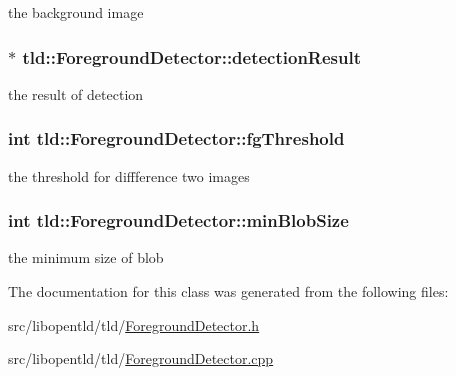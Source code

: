 the background image 

\hypertarget{classtld_1_1ForegroundDetector_a01d0c37f4019847febbea0f9a121b49b}{
\subsubsection[{detection\-Result}]{$\ast$ tld\-::\-Foreground\-Detector\-::detection\-Result}}\label{classtld_1_1ForegroundDetector_a01d0c37f4019847febbea0f9a121b49b}


the result of detection 

\hypertarget{classtld_1_1ForegroundDetector_a317e60e1eb84270f60e818c0cb896416}{
\subsubsection[{fg\-Threshold}]{\setlength{\rightskip}{0pt plus 5cm}int tld\-::\-Foreground\-Detector\-::fg\-Threshold}}\label{classtld_1_1ForegroundDetector_a317e60e1eb84270f60e818c0cb896416}


the threshold for diffference two images 

\hypertarget{classtld_1_1ForegroundDetector_ac274f17680c4551c9b3198e88b5bcd42}{
\subsubsection[{min\-Blob\-Size}]{\setlength{\rightskip}{0pt plus 5cm}int tld\-::\-Foreground\-Detector\-::min\-Blob\-Size}}\label{classtld_1_1ForegroundDetector_ac274f17680c4551c9b3198e88b5bcd42}


the minimum size of blob 



The documentation for this class was generated from the following files\-:\begin{DoxyCompactItemize}
\item 
src/libopentld/tld/\hyperlink{ForegroundDetector_8h}{Foreground\-Detector.\-h}\item 
src/libopentld/tld/\hyperlink{ForegroundDetector_8cpp}{Foreground\-Detector.\-cpp}\end{DoxyCompactItemize}
